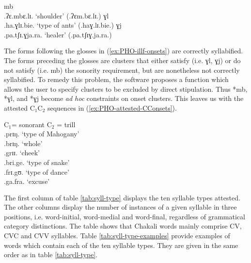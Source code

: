 \begin{exe}
\ex\label{ex:PHO-illf-onsets}
\begin{xlist}
\ex *mb \\
 .ʔɛ.mbɛ.lɪ.		`shoulder'    (.ʔɛm.bɛ.lɪ.)
\ex *ɣl\\
 .ha.ɣlɪ.bie.		`type of ants'   (.haɣ.lɪ.bie.)	
\ex *ɣj\\
 .pa.tʃɪ.ɣja.ra.	`healer'  (.pa.tʃɪɣ.ja.ra.)


\end{xlist}
\end{exe}

The forms following the glosses in  (\ref{ex:PHO-illf-onsets}) are correctly
syllabified. The forms preceding the glosses are clusters that either satisfy
(i.e. ɣl, ɣj) or do not satisfy  (i.e. mb)  the sonority requirement, but are
nonetheless not correctly syllabified. To remedy  this problem, the software
proposes  a function which allows the user to specify clusters to be excluded by
direct stipulation.  Thus  *mb, *ɣl,  and  *ɣj  become {\it ad hoc} constraints
on onset clusters. This leaves us with the attested C$_{1}$C$_{2}$ sequences in
(\ref{ex:PHO-attested-CConsets}).  


\begin{exe}
\ex\label{ex:PHO-attested-CConsets}{C$_{1}$= {\sc sonorant} C$_{2}$ = {\sc
trill}}\\ 
.prɪŋ.	  	`type of Mahogany'\\
	 .brɪŋ.		  `whole'\\
	 .grɪɪ.		  `cheek'\\
.bri.ge.	 	  `type of snake'\\
.frɪ.gʊ. 		  `type of dance'\\
.ga.fra.	 `excuse'\\
\end{exe}


The first column of table   \ref{tab:syll-type} displays the ten syllable types
attested.  The other columns display the number of instances of a given
syllable in three positions, i.e.  word-initial, word-medial and word-final,
regardless of  grammatical category distinctions. The table shows that
Chakali words  mainly comprise CV, CVC and CVV syllables. Table
\ref{tab:syll-type-examples} provide examples of words which contain each of the
ten syllable types. They are given in the same order as in table
\ref{tab:syll-type}.  



